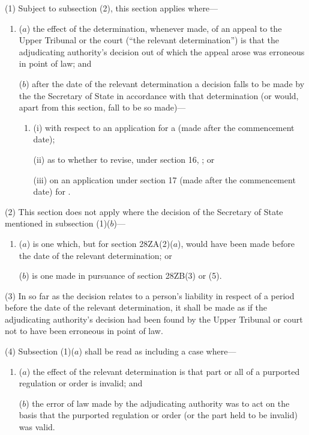 \documentclass[a4paper]{article}
\begin{document}
(1) Subject to subsection (2), this section applies where---
\begin{enumerate}\item[]
($a$) the effect of the determination, whenever made, of an appeal to the Upper
Tribunal or the court (“the relevant determination”) is that the adjudicating
authority’s decision out of which the appeal arose was erroneous in point of
law; and

($b$) after the date of the relevant determination a decision falls to be made by the
the Secretary of State in accordance with that determination (or would,
apart from this section, fall to be so made)---
\begin{enumerate}\item[]
(i) with respect to an application for a  (made after the commencement date);

(ii) as to whether to revise, under section 16, ; or

(iii) on an application under section 17 (made after the commencement date) for .
\end{enumerate}
\end{enumerate}

(2) This section does not apply where the decision of the Secretary of State mentioned in subsection (1)($b$)---
\begin{enumerate}\item[]
($a$) is one which, but for section 28ZA(2)($a$), would have been made before the date of the relevant determination; or

($b$) is one made in pursuance of section 28ZB(3) or (5).
\end{enumerate}

(3)
In so far as the decision relates to a person’s liability in respect of a period before the date of the relevant determination, it shall be made as if the adjudicating authority’s decision had been found by the Upper Tribunal or court not to have been erroneous in point of law.

(4)
Subsection (1)($a$) shall be read as including a case where---
\begin{enumerate}\item[]
($a$) the effect of the relevant determination is that part or all of a purported regulation or order is invalid; and

($b$) the error of law made by the adjudicating authority was to act on the basis that the purported regulation or order (or the part held to be invalid) was valid.
\end{enumerate}
\end{document}
